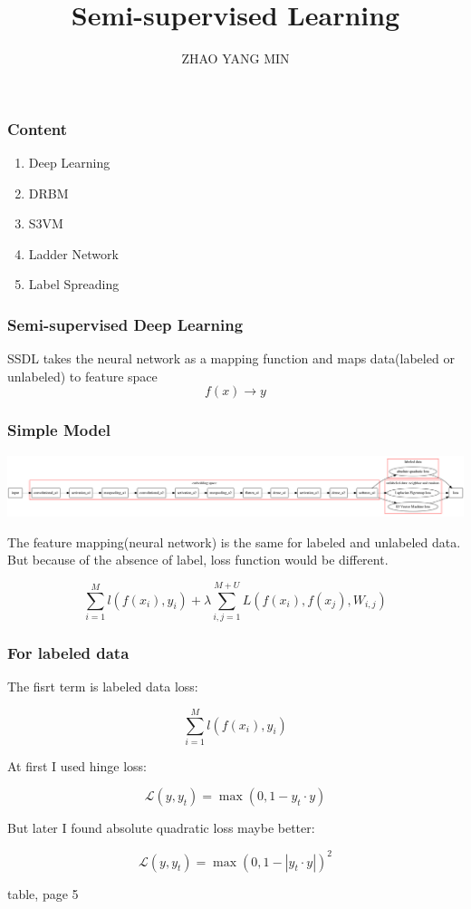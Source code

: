 \documentclass{beamer}
\title{Semi-supervised Learning}
\author{ZHAO YANG MIN}
\institute{Fudan Univ.}
\begin{document}
 
\frame{\titlepage}
\begin{frame}
\frametitle{Content}
\begin{enumerate}
\item Deep Learning \\ 
\item DRBM  \\
\item S3VM  \\ 
\item Ladder Network \\
\item Label Spreading \\ 
\end{enumerate}
\end{frame}
\begin{frame}
\frametitle{Semi-supervised Deep Learning}
SSDL takes the neural network as a mapping function and maps data(labeled or unlabeled) to feature space\\

\[ f(x) \rightarrow y \]

\end{frame}
\begin{frame}
\frametitle{Simple Model}

\begin{center}
\includegraphics[width=\linewidth]{fig10.png}
\end{center}

The feature mapping(neural network) is the same for labeled and unlabeled data. But because of the absence of label, loss function would be different.

$$ \sum_{i=1}^M l (f(x_i), y_i) + \lambda \sum_{i,j=1}^{M+U} L(f(x_i), f(x_j), W_{i,j}) $$
\end{frame}
\begin{frame}
\frametitle{For labeled data}

The fisrt term is labeled data loss:

$$ \sum_{i=1}^M l (f(x_i), y_i) $$

At first I used hinge loss:

$$ \mathcal{L}(y, y_t) = \max(0, 1 - y_t \cdot y) $$

But later I found absolute quadratic loss maybe better:

$$ \mathcal{L}(y, y_t) = \max(0, 1 - |y_t \cdot y|)^2 $$

table, page 5
\end{frame}
\end{document}
